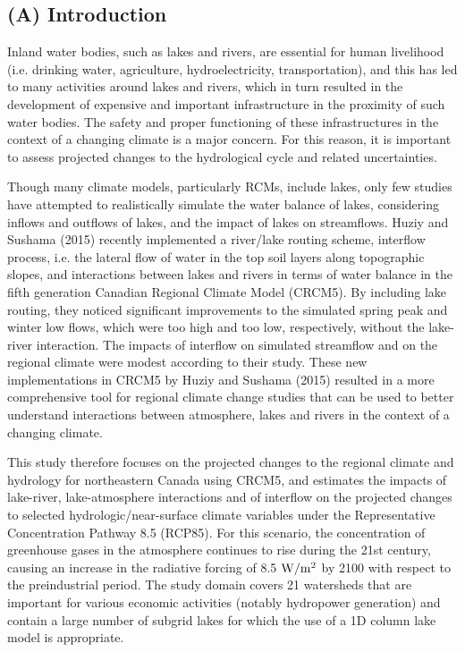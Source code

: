 \documentclass[a0,landscape]{a0poster}
\begin{document}
\begin{multicols}{3}

\color{SaddleBrown} %

\section*{(A) Introduction}
Inland water bodies, such as lakes and rivers, are essential for human
livelihood (i.e. drinking water, agriculture, hydroelectricity, transportation),
and this has led to many activities around lakes and rivers, which in turn
resulted in the development of expensive and important infrastructure in the
proximity of such water bodies. The safety and proper functioning of these
infrastructures in the context of a changing climate is a major concern. For
this reason, it is important to assess projected changes to the hydrological
cycle and related uncertainties.

Though many climate models, particularly RCMs, include lakes, only few studies
have attempted to realistically simulate the water balance of lakes, considering
inflows and outflows of lakes, and the impact of lakes on streamflows. Huziy and
Sushama (2015) recently implemented a river/lake routing scheme, interflow
process, i.e. the lateral flow of water in the top soil layers along topographic
slopes, and interactions between lakes and rivers in terms of water balance in
the fifth generation Canadian Regional Climate Model (CRCM5). By including lake
routing, they noticed significant improvements to the simulated spring peak and
winter low flows, which were too high and too low, respectively, without the
lake-river interaction. The impacts of interflow on simulated streamflow and on
the regional climate were modest according to their study. These new
implementations in CRCM5 by Huziy and Sushama (2015) resulted in a more
comprehensive tool for regional climate change studies that can be used to
better understand interactions between atmosphere, lakes and rivers in the
context of a changing climate.

This study therefore focuses on the projected changes to the regional climate
and hydrology for northeastern Canada using CRCM5, and estimates the
impacts of lake-river, lake-atmosphere interactions and of interflow on the
projected changes to selected hydrologic/near-surface climate variables under
the Representative Concentration Pathway 8.5 (RCP85). For this scenario, the
concentration of greenhouse gases in the atmosphere continues to rise during the
21st century, causing an increase in the radiative forcing of 8.5 ${\rm W/m^2}$ by 2100
with respect to the preindustrial period. The study domain covers 21
watersheds that are important for various economic activities (notably
hydropower generation) and contain a large number of subgrid lakes for which the
use of a 1D column lake model is appropriate.


\end{multicols}
\end{document}
